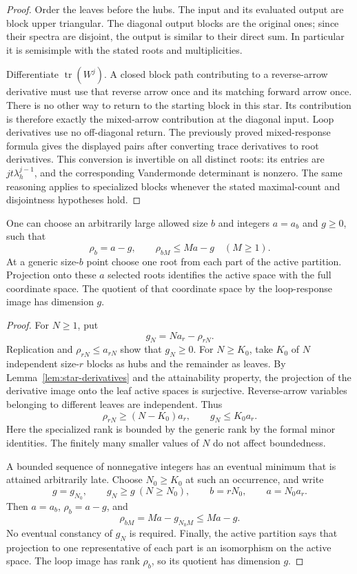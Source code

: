 \begin{proof}
Order the leaves before the hubs. The input and its evaluated output
are block upper triangular. The diagonal output blocks are the
original ones; since their spectra are disjoint, the output is similar
to their direct sum. In particular it is semisimple with the stated
roots and multiplicities.

Differentiate \(\operatorname{tr}(W^j)\). A closed block path
contributing to a reverse-arrow derivative must use that reverse
arrow once and its matching forward arrow once. There is no other
way to return to the starting block in this star. Its contribution
is therefore exactly the mixed-arrow contribution at the diagonal
input. Loop derivatives use no off-diagonal return. The previously
proved mixed-response formula gives the displayed pairs after
converting trace derivatives to root derivatives. This conversion is
invertible on all distinct roots: its entries are
\(jt\lambda_h^{j-1}\), and the corresponding Vandermonde determinant
is nonzero. The same reasoning applies to specialized blocks whenever
the stated maximal-count and disjointness hypotheses hold.
\end{proof}

\begin{lemma}
\label{lem:tail-defect}
One can choose an arbitrarily large allowed size \(b\) and integers
\(a=a_b\) and \(g\geq0\), such that
\[
 \rho_b=a-g,
 \qquad
 \rho_{bM}\leq Ma-g \quad(M\geq1).
\]
At a generic size-\(b\) point choose one root from each part of the
active partition. Projection onto these \(a\) selected roots
identifies the active space with the full coordinate space. The
quotient of that coordinate space by the loop-response image has
dimension \(g\).
\end{lemma}

\begin{proof}
For \(N\geq1\), put
\[
 g_N=Na_r-\rho_{rN}.
\]
Replication and \(\rho_{rN}\leq a_{rN}\) show that \(g_N\geq0\).
For \(N\geq K_0\), take \(K_0\) of \(N\) independent size-\(r\)
blocks as hubs and the remainder as leaves. By
Lemma~\ref{lem:star-derivatives} and the attainability property, the
projection of the derivative image onto the leaf active spaces is
surjective. Reverse-arrow variables belonging to different leaves
are independent. Thus
\[
 \rho_{rN}\geq(N-K_0)a_r,
 \qquad g_N\leq K_0a_r.
\]
Here the specialized rank is bounded by the generic rank by the
formal minor identities. The finitely many smaller values of \(N\)
do not affect boundedness.

A bounded sequence of nonnegative integers has an eventual minimum
that is attained arbitrarily late. Choose \(N_0\geq K_0\) at such
an occurrence, and write
\[
 g=g_{N_0},\qquad
 g_N\geq g\ (N\geq N_0),\qquad
 b=rN_0,\qquad a=N_0a_r.
\]
Then \(a=a_b\), \(\rho_b=a-g\), and
\[
 \rho_{bM}=Ma-g_{N_0M}\leq Ma-g.
\]
No eventual constancy of \(g_N\) is required. Finally, the active
partition says that projection to one representative of each part
is an isomorphism on the active space. The loop image has rank
\(\rho_b\), so its quotient has dimension \(g\).
\end{proof}

